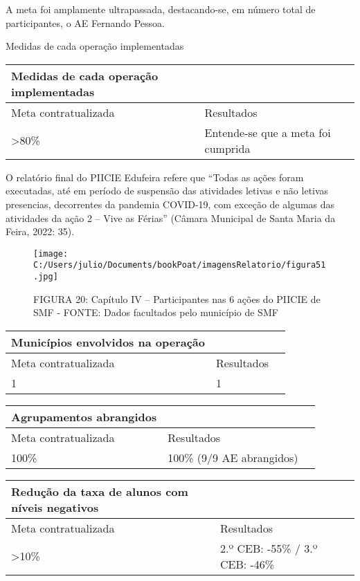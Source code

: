 \documentclass[
]{book}
\begin{document}
A meta foi amplamente ultrapassada, destacando-se, em número total de participantes, o AE Fernando Pessoa.

Medidas de cada operação implementadas

\begin{longtable}[]{@{}lll@{}}
\toprule()
Medidas de cada operação implementadas & & \\
\midrule()
\endhead
Meta contratualizada & Resultados & \\
\textgreater80\% & Entende-se que a meta foi cumprida & \\
\bottomrule()
\end{longtable}

O relatório final do PIICIE Edufeira refere que ``Todas as ações foram executadas, até em período de suspensão das atividades letivas e não letivas presencias, decorrentes da pandemia COVID-19, com exceção de algumas das atividades da ação 2 -- Vive as Férias'' (Câmara Municipal de Santa Maria da Feira, 2022: 35).

\begin{figure}
\centering
\texttt{[image: C:/Users/julio/Documents/bookPoat/imagensRelatorio/figura51.jpg]}
\caption{FIGURA 20: Capítulo IV -- Participantes nas 6 ações do PIICIE de SMF - FONTE: Dados facultados pelo município de SMF}
\end{figure}

\begin{longtable}[]{@{}lll@{}}
\toprule()
Municípios envolvidos na operação & & \\
\midrule()
\endhead
Meta contratualizada & Resultados & \\
1 & 1 & \\
\bottomrule()
\end{longtable}

\begin{longtable}[]{@{}lll@{}}
\toprule()
Agrupamentos abrangidos & & \\
\midrule()
\endhead
Meta contratualizada & Resultados & \\
100\% & 100\% (9/9 AE abrangidos) & \\
\bottomrule()
\end{longtable}

\begin{longtable}[]{@{}lll@{}}
\toprule()
Redução da taxa de alunos com níveis negativos & & \\
\midrule()
\endhead
Meta contratualizada & Resultados & \\
\textgreater10\% & 2.º CEB: -55\% / 3.º CEB: -46\% & \\
\bottomrule()
\end{longtable}
\end{document}

